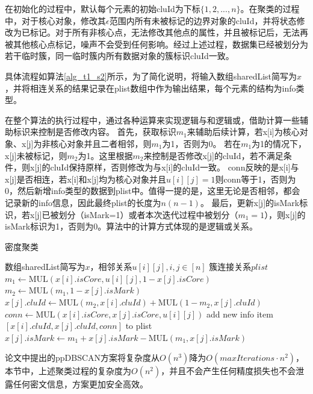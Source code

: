 在初始化的过程中，默认每个元素的初始cluId为下标$ \{1,2,...,n\} $。在聚类的过程中，对于核心对象，修改其$ \epsilon $范围内所有未被标记的边界对象的cluId，并将状态修改为已标记。对于所有非核心点，无法修改其他点的属性，并且被标记后，无法再被其他核心点标记，噪声不会受到任何影响。经过上述过程，数据集已经被划分为若干临时簇，同一临时簇内所有数据对象的簇标识cluId一致。

具体流程如算法\ref{alg_t1_s2}所示，为了简化说明，将输入数组sharedList简写为$ x $，并将相连关系的结果记录在plist数组中作为输出结果，每个元素的结构为info类型。

在整个算法的执行过程中，通过各种运算来实现逻辑与和逻辑或，借助计算一些辅助标识来控制是否修改内容。
首先，获取标识$ m_1 $来辅助后续计算，若x[i]为核心对象、x[j]为非核心对象并且二者相邻，则$ m_1 $为1，否则为0。
若在$ m_1 $为1的情况下，x[j]未被标记，则$ m_2 $为1。这里根据$ m_2 $来控制是否修改x[j]的cluId，若不满足条件，则x[j]的cluId保持原样，否则修改为与x[i]的cluId一致。
conn反映的是x[i]与x[j]是否相连，若x[i]和x[j]均为核心对象并且$ u[i][j]=1 $则conn等于1，否则为0，然后新增info类型的数据到plist中。值得一提的是，这里无论是否相邻，都会记录新的info信息，因此最终plist的长度为$ n(n-1) $。
最后，更新x[j]的isMark标识，若x[j]已被划分（isMark=1）或者本次迭代过程中被划分（$ m_1 = 1 $），则x[j]的isMark标识为1，否则为0。算法中的计算方式体现的是逻辑或关系。

\begin{algorithm}[htbp]
	\renewcommand{\algorithmicrequire}{\textbf{输入:}}
	\renewcommand{\algorithmicensure}{\textbf{输出:}}
	\caption{密度聚类}
	\label{alg_t1_s2}
	\begin{algorithmic}[1]
		\REQUIRE 数组sharedList简写为$ x $，相邻关系$ u[i][j],i,j\in[n] $
		\ENSURE 簇连接关系$ plist $
		\STATE $ m_1 \leftarrow \text{MUL}(x[i].isCore, u[i][j], 1-x[j].isCore) $
		\STATE $ m_2 \leftarrow \text{MUL}(m_1, 1-x[j].isMark) $
		\STATE $ x[j].cluId \leftarrow  \text{MUL}(m_2, x[i].cluId) + \text{MUL}(1-m_2, x[j].cluId)$
		\STATE $ conn \leftarrow \text{MUL}(x[i].isCore, x[j].isCore, u[i][j]) $
		\STATE add new info item $ [x[i].cluId, x[j].cluId, conn] $ to plist
		\STATE $ x[j].isMark \leftarrow m_1 + x[j].isMark - \text{MUL}(m_1, x[j].isMark) $
		\ENDFOR
		\ENDFOR
	\end{algorithmic}
\end{algorithm}

论文\cite{bozdemir2021privacy}中提出的ppDBSCAN方案将复杂度从$ O(n^3)$降为$ O(maxIterations \cdot n^2) $，本节中，上述聚类过程的复杂度为$ O(n^2) $，并且不会产生任何精度损失也不会泄露任何密文信息，方案更加安全高效。

